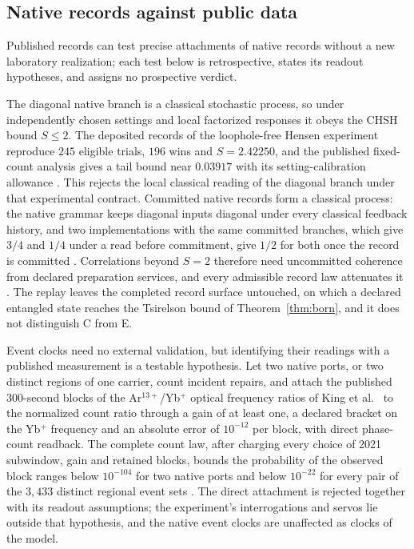 \documentclass[11pt]{article}
\theoremstyle{definition}
\theoremstyle{remark}
\begin{document}
\subsection{Native records against public data}
\label{sec:public-records}

Published records can test precise attachments of native records without a
new laboratory realization; each test below is retrospective, states its
readout hypotheses, and assigns no prospective verdict.

The diagonal native branch is a classical stochastic process, so under
independently chosen settings and local factorized responses it obeys the
CHSH bound $S\le2$. The deposited records of the loophole-free Hensen
experiment \cite{hensen2015} reproduce $245$ eligible trials, $196$ wins and
$S=2.42250$, and the published fixed-count analysis gives a tail bound near
$0.03917$ with its setting-calibration allowance \cite{ophbell}. This
rejects the local classical reading of the diagonal branch under that
experimental contract. Committed native records form a classical process:
the native grammar keeps diagonal inputs diagonal under every classical
feedback history, and two implementations with the same committed branches,
which give $3/4$ and $1/4$ under a read before commitment, give $1/2$ for
both once the record is committed \cite{oSOURCESELECT}. Correlations beyond
$S=2$ therefore need uncommitted coherence from declared preparation
services, and every admissible record law attenuates it \cite{ophrecordlaws}.
The replay leaves the completed record
surface untouched, on which a declared entangled state reaches the
Tsirelson bound of Theorem~\ref{thm:born}, and it does not distinguish C
from E.

Event clocks need no external validation, but identifying their readings
with a published measurement is a testable hypothesis. Let two native ports,
or two distinct regions of one carrier, count incident repairs, and attach
the published $300$-second blocks of the Ar$^{13+}$/Yb$^+$ optical frequency
ratios of King et al.\ \cite{king2022} to the normalized count ratio through
a gain of at least one, a declared bracket on the Yb$^+$ frequency and an
absolute error of $10^{-12}$ per block, with direct phase-count readback. The
complete count law, after charging every choice of 2021 subwindow, gain and
retained blocks, bounds the probability of the observed block ranges below
$10^{-104}$ for two native ports and below $10^{-22}$ for every pair of the
$3{,}433$ distinct regional event sets \cite{ophpublicdata}. The direct
attachment is rejected together with its readout assumptions; the
experiment's interrogations and servos lie outside that hypothesis, and the
native event clocks are unaffected as clocks of the model.
\end{document}
